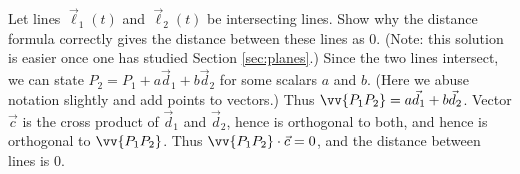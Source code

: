 {Let lines $\vec \ell_1(t)$ and $\vec \ell_2(t)$ be intersecting lines. Show why the distance formula correctly gives the distance between these lines as $0$.\label{10_05_ex_30}
}
{(Note: this solution is easier once one has studied Section \ref{sec:planes}.) Since the two lines intersect, we can state $P_2= P_1 + a\vec d_1+b\vec d_2$ for some scalars $a$ and $b$. (Here we abuse notation slightly and add points to vectors.) Thus $\vv{P_1P_2} = a\vec d_1+b\vec d_2$. Vector $\vec c$ is the cross product of $\vec d_1$ and $\vec d_2$, hence is orthogonal to both, and hence is orthogonal to $\vv{P_1P_2}$. Thus $\vv{P_1P_2}\cdot\vec c = 0$, and the distance between lines is $0$.
}

